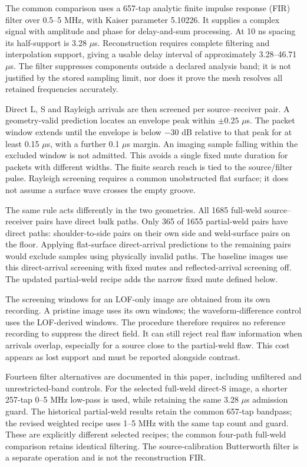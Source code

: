 \documentclass[11pt]{article}
\begin{document}
The common comparison uses a 657-tap analytic finite impulse response (FIR) filter over 0.5--5 MHz, with Kaiser parameter 5.10226. It supplies a complex signal with amplitude and phase for delay-and-sum processing. At 10 ns spacing its half-support is 3.28 $\mu$s. Reconstruction requires complete filtering and interpolation support, giving a usable delay interval of approximately 3.28--46.71 $\mu$s. The filter suppresses components outside a declared analysis band; it is not justified by the stored sampling limit, nor does it prove the mesh resolves all retained frequencies accurately.

Direct L, S and Rayleigh arrivals are then screened per source--receiver pair. A geometry-valid prediction locates an envelope peak within $\pm0.25$ $\mu$s. The packet window extends until the envelope is below $-30$ dB relative to that peak for at least 0.15 $\mu$s, with a further 0.1 $\mu$s margin. An imaging sample falling within the excluded window is not admitted. This avoids a single fixed mute duration for packets with different widths. The finite search reach is tied to the source/filter pulse. Rayleigh screening requires a common unobstructed flat surface; it does not assume a surface wave crosses the empty groove.

The same rule acts differently in the two geometries. All 1685 full-weld source--receiver pairs have direct bulk paths. Only 365 of 1655 partial-weld pairs have direct paths: shoulder-to-side pairs on their own side and weld-surface pairs on the floor. Applying flat-surface direct-arrival predictions to the remaining pairs would exclude samples using physically invalid paths. The baseline images use this direct-arrival screening with fixed mutes and reflected-arrival screening off. The updated partial-weld recipe adds the narrow fixed mute defined below.

The screening windows for an LOF-only image are obtained from its own recording. A pristine image uses its own windows; the waveform-difference control uses the LOF-derived windows. The procedure therefore requires no reference recording to suppress the direct field. It can still reject real flaw information when arrivals overlap, especially for a source close to the partial-weld flaw. This cost appears as lost support and must be reported alongside contrast.

Fourteen filter alternatives are documented in this paper, including unfiltered and unrestricted-band controls. For the selected full-weld direct-S image, a shorter 257-tap 0--5 MHz low-pass is used, while retaining the same 3.28 $\mu$s admission guard. The historical partial-weld results retain the common 657-tap bandpass; the revised weighted recipe uses 1--5 MHz with the same tap count and guard. These are explicitly different selected recipes; the common four-path full-weld comparison retains identical filtering. The source-calibration Butterworth filter is a separate operation and is not the reconstruction FIR.
\end{document}
